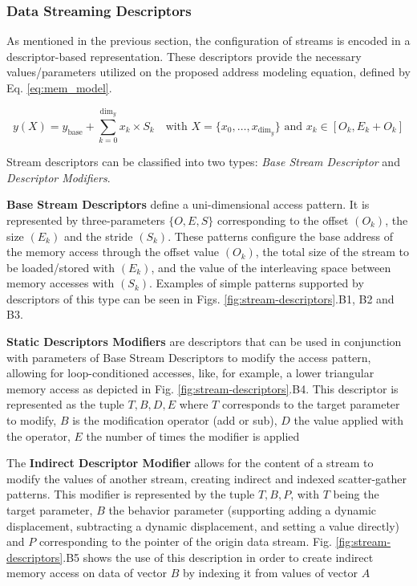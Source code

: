 \subsubsection{Data Streaming Descriptors}

As mentioned in the previous section, the configuration of streams is encoded in a descriptor-based representation. These descriptors provide the necessary values/parameters utilized on the proposed address modeling equation, defined by Eq. \ref{eq:mem_model}. 

\begin{equation}
    y(X) = y_{\text{base}} + \sum_{k=0}^{\text{dim}_y} x_k \times S_k
    \quad \text{with } X = \{x_0, \ldots, x_{\text{dim}_y}\} \text{ and } x_k \in [O_k, E_k+O_k]
    \label{eq:mem_model}
\end{equation}

Stream descriptors can be classified into two types: \textit{Base Stream Descriptor} and \textit{Descriptor Modifiers}.

\textbf{Base Stream Descriptors} define a uni-dimensional access pattern. It is represented by three-parameters $\{O, E, S\}$ corresponding to the offset $(O_k)$, the size $(E_k)$ and the stride $(S_k)$. These patterns configure the base address of the memory access through the offset value $(O_k)$, the total size of the stream to be loaded/stored with $(E_k)$, and the value of the interleaving space between memory accesses with $(S_k)$. Examples of simple patterns supported by descriptors of this type can be seen in Figs. \ref{fig:stream-descriptors}.B1, B2 and B3.

\textbf{Static Descriptors Modifiers} are descriptors that can be used in conjunction with parameters of Base Stream Descriptors to modify the access pattern, allowing for loop-conditioned accesses, like, for example, a lower triangular memory access as depicted in Fig. \ref{fig:stream-descriptors}.B4. This descriptor is represented as the tuple ${T, B, D, E}$ where $T$ corresponds to the target parameter to modify, $B$ is the modification operator (add or sub), $D$ the value applied with the operator, $E$ the number of times the modifier is applied 

The \textbf{Indirect Descriptor Modifier} allows for the content of a stream to modify the values of another stream, creating indirect and indexed scatter-gather patterns. This modifier is represented by the tuple ${T, B, P}$, with $T$ being the target parameter, $B$ the behavior parameter (supporting adding a dynamic displacement, subtracting a dynamic displacement, and setting a value directly) and $P$ corresponding to the pointer of the origin data stream. Fig. \ref{fig:stream-descriptors}.B5 shows the use of this description in order to create indirect memory access on data of vector $B$ by indexing it from values of vector $A$

